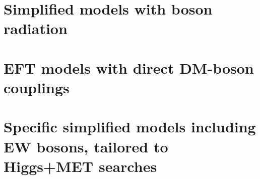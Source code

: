 \section{Simplified models with boson radiation} \label{sec:bosonrad}


\section{EFT models with direct DM-boson couplings}
\label{sec:EFT_models_with_direct_DM_boson_couplings}


\section{Specific simplified models including EW bosons, tailored to Higgs+MET searches}



